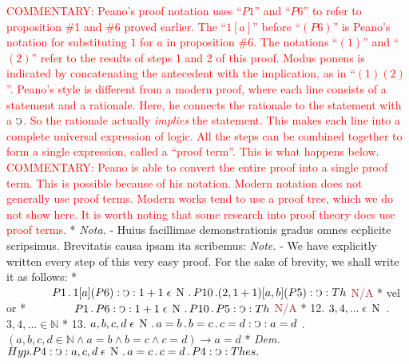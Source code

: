 \documentclass{book}
\newcommand{\C}{\mathop{\sbox0{$\displaystyle$$\reflectbox{C}$} %
\raisebox{-\height+\ht0-0.05cm}[\ht0][\dp0]{\scalebox{0.8}[0.8]{\copy0}}}\displaylimits} %
\newcommand{\p}{\mathop{\sbox0{$\displaystyle$$.$}
\raisebox{-\height+\ht0}[\ht0][\dp0]{\scalebox{1}[1]{\copy0}}}\displaylimits} %
\newcommand{\smallIn}{\ensuremath{\mathrel{\epsilon}}}
\newcommand{\N}{\mathop{\thinspace \text{N} \thinspace}}
\newcommand\commentary[1]{\textcolor{red}{COMMENTARY: #1}}
\newcommand\notPossible{\textcolor{brown}{N/A}}
\newenvironment{translateTwoCol}
               { %
                 \columnratio{0.5, 0.5} \begin{paracol}{2}
                 \newcommand{\LAT}{\switchcolumn[0]*}
                 \newcommand{\ENG}{\switchcolumn[1]}
               }
               { %
                 \let\ENG\undefined
                 \let\LAT\undefined
                 \end{paracol}
               }
\begin{document}
\begin{translateTwoCol}
\vspace{1em}
\commentary{Peano's proof notation uses ``$P1$'' and ``$P6$'' to refer to proposition \#1 and \#6 proved earlier.  The ``$1[a]$'' before ``$(P6)$'' is Peano's notation for substituting $1$ for $a$ in proposition \#6.   The notations ``$(1)$'' and ``$(2)$'' refer to the results of steps 1 and 2 of this proof.  Modus ponens is indicated by concatenating the antecedent with the implication, as in ``$(1)(2)$''.  Peano's style is different from a modern proof, where each line consists of a statement and a rationale.  Here, he connects the rationale to the statement with a $\C$.  So the rationale actually \emph{implies} the statement.  This makes each line into a complete universal expression of logic.  All the steps can be combined together to form a single expression, called a ``proof term''.  This is what happens below.}
\ENG
\commentary{Peano is able to convert the entire proof into a single proof term.  This is possible because of his notation.  Modern notation does not generally use proof terms.  Modern works tend to use a proof tree, which we do not show here.  It is worth noting that some research into proof theory does use proof terms.}
\LAT
\emph{Nota.} - Huius facillimae demonstrationis gradus omnes ecplicite scripsimus. Brevitatis causa ipsam ita scribemus:
\vspace{1em}
\ENG
\vspace{1em}
\emph{Note.} - We have explicitly written every step of this very easy proof. For the sake of brevity, we shall write it as follows:
\vspace{1em}
\LAT
$\hspace{1.4cm} P 1 \p 1 [a] (P 6) : \C : 1 +1 \smallIn \N \p P 10 \p (2, 1+1) [a, b] (P 5) : \C : Th$
\ENG
\notPossible
\LAT
vel
\ENG
or
\LAT
$\hspace{1.4cm} P 1 \p P 6 : \C : 1 + 1 \smallIn \N \p P 10 \p P 5 : \C : Th$
\ENG
\notPossible
\LAT
12. \hspace{0.67cm} $3, 4,... \smallIn \N$
\ENG
12. \hspace{0.67cm} $3, 4, ... \in \mathbb{N}$
\LAT
13. \hspace{0.67cm} $a,b,c,d \smallIn \N \p a = b \p b = c \p c = d : \C : a = d$
\ENG
13. \hspace{0.67cm} $(a,b,c,d \in \mathbb{N} \wedge a = b \wedge b = c \wedge c = d ) \rightarrow a = d$
\LAT
\emph{Dem.} \hspace{0.27cm} $Hyp. P 4 : \C : a,c,d \smallIn \N \p a = c \p c = d \p P4 : \C : Thes.$

\end{translateTwoCol}
\end{document}
